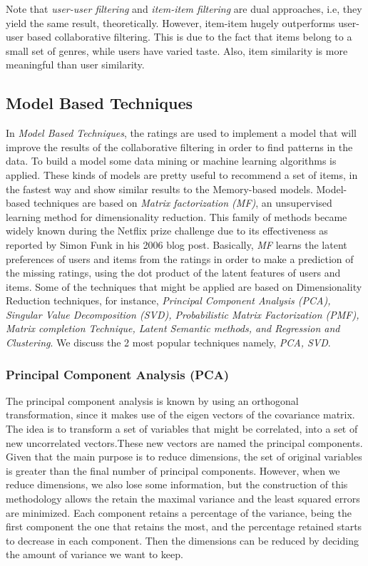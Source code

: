 \documentclass[conference]{IEEEtran}
\begin{document}
Note that \textit{user-user filtering} and \textit{item-item filtering} are dual approaches, i.e, they yield the same result, theoretically. However, item-item hugely outperforms user-user based collaborative filtering. This is due to the fact that items belong to a small set of genres, while users have varied taste. Also, item similarity is more meaningful than user similarity. 

\subsection{Model Based Techniques}
In \textit{Model Based Techniques}, the ratings are used to implement a model that will improve the results of the collaborative filtering in order to find patterns in the data. To build a model some data mining or machine learning algorithms is applied. These kinds of models are pretty useful to recommend a set of items, in the fastest way and show similar results to the Memory-based models. Model-based techniques are based on \textit{Matrix factorization (MF)}, an unsupervised learning method for dimensionality reduction. This family of methods became widely known during the Netflix prize challenge due to its effectiveness as reported by Simon Funk in his 2006 blog post. Basically, \textit{MF} learns the latent preferences of users and items from the ratings in order to make a prediction of the missing ratings, using the dot product of the latent features of users and items.
Some of the techniques that might be applied are based on Dimensionality Reduction techniques, for instance, \textit{Principal Component Analysis (PCA), Singular Value Decomposition (SVD), Probabilistic Matrix Factorization (PMF), Matrix completion Technique, Latent Semantic methods, and Regression and Clustering}. We discuss the 2 most popular techniques namely, \textit{PCA, SVD}.

\subsubsection{Principal Component Analysis (PCA)}
The principal component analysis is known by using an orthogonal transformation, since it makes use of the eigen vectors of the covariance matrix. The idea is to transform a set of variables that might be correlated, into a set of new uncorrelated vectors.These new vectors are named the principal components.
Given that the main purpose is to reduce dimensions, the set of original variables is greater than the final number of principal components. However, when
 we reduce dimensions, we also lose some information, but the construction of this methodology allows the retain the maximal variance and the least squared errors are minimized. Each component retains a percentage of the variance, being the first component the one that retains the most, and the percentage retained starts to decrease in each component. Then the dimensions can be reduced by deciding the amount of variance we want to keep.
 
\end{document}
